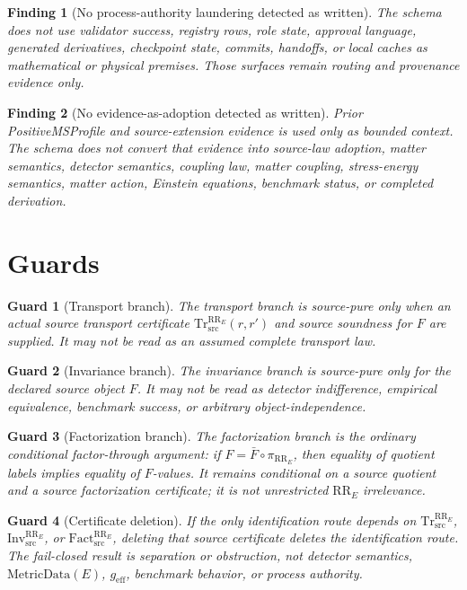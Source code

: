 \documentclass[11pt]{article}
\newcommand{\RRE}{\mathrm{RR}_{E}}
\newcommand{\TrRR}{\mathrm{Tr}^{\RRE}_{\mathrm{src}}}
\newcommand{\InvRR}{\mathrm{Inv}^{\RRE}_{\mathrm{src}}}
\newcommand{\FactRR}{\mathrm{Fact}^{\RRE}_{\mathrm{src}}}
\newcommand{\MetricData}{\mathrm{MetricData}}
\newcommand{\geff}{g_{\mathrm{eff}}}
\newtheorem{finding}{Finding}
\newtheorem{guard}{Guard}
\begin{document}
\begin{finding}[No process-authority laundering detected as written]
The schema does not use validator success, registry rows, role state, approval
language, generated derivatives, checkpoint state, commits, handoffs, or local
caches as mathematical or physical premises. Those surfaces remain routing and
provenance evidence only.
\end{finding}

\begin{finding}[No evidence-as-adoption detected as written]
Prior PositiveMSProfile and source-extension evidence is used only as bounded
context. The schema does not convert that evidence into source-law adoption,
matter semantics, detector semantics, coupling law, matter coupling,
stress-energy semantics, matter action, Einstein equations, benchmark status,
or completed derivation.
\end{finding}

\section{Guards}

\begin{guard}[Transport branch]
The transport branch is source-pure only when an actual source transport
certificate \(\TrRR(r,r')\) and source soundness for \(F\) are supplied. It may
not be read as an assumed complete transport law.
\end{guard}

\begin{guard}[Invariance branch]
The invariance branch is source-pure only for the declared source object \(F\).
It may not be read as detector indifference, empirical equivalence, benchmark
success, or arbitrary object-independence.
\end{guard}

\begin{guard}[Factorization branch]
The factorization branch is the ordinary conditional factor-through argument:
if \(F=\bar F\circ\pi_{\RRE}\), then equality of quotient labels implies
equality of \(F\)-values. It remains conditional on a source quotient and a
source factorization certificate; it is not unrestricted \(\RRE\) irrelevance.
\end{guard}

\begin{guard}[Certificate deletion]
If the only identification route depends on \(\TrRR\), \(\InvRR\), or
\(\FactRR\), deleting that source certificate deletes the identification route.
The fail-closed result is separation or obstruction, not detector semantics,
\(\MetricData(E)\), \(\geff\), benchmark behavior, or process authority.
\end{guard}
\end{document}
